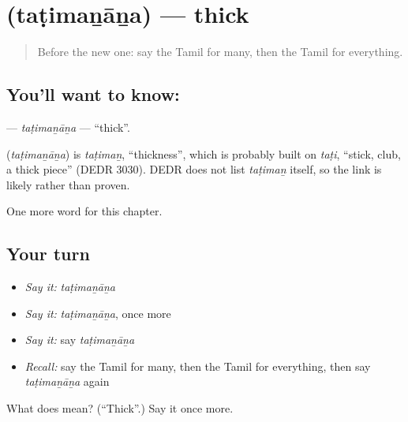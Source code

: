 \section[\texorpdfstring{\ta{தடிமனான} (taṭimaṉāṉa)}{தடிமனான (taṭimaṉāṉa)}]{ (taṭimaṉāṉa) — thick}

\label{lesson:TA-C181-tatimanana}



\begin{quote}
Before the new one: say the Tamil for many, then the Tamil for everything.
\end{quote}

\subsection*{You'll want to know: }
\textbf{} — \emph{taṭimaṉāṉa} — \textquotedblleft{}thick\textquotedblright{}.

\begin{cousinweb}
\textbf{} (\emph{taṭimaṉāṉa}) is \emph{taṭimaṉ}, \textquotedblleft{}thickness\textquotedblright{}, which is probably built on \emph{taṭi}, \textquotedblleft{}stick, club, a thick piece\textquotedblright{} (DEDR 3030). DEDR does not list \emph{taṭimaṉ} itself, so the link is likely rather than proven.
\end{cousinweb}

\begin{grammarlens}[title={What you've built}]
One more word for this chapter.
\end{grammarlens}

\subsection*{Your turn}
\begin{itemize}
\raggedright
  \item \emph{Say it:} \emph{taṭimaṉāṉa}
  \item \emph{Say it:} \emph{taṭimaṉāṉa}, once more
  \item \emph{Say it:} say \emph{taṭimaṉāṉa}
  \item \emph{Recall:} say the Tamil for many, then the Tamil for everything, then say \emph{taṭimaṉāṉa} again
\end{itemize}

\begin{tcolorbox}[breakable,colback=teal!4,colframe=teal!35!black,title={Before you move on}]
What does  mean? (\textquotedblleft{}Thick\textquotedblright{}.) Say it once more.
\end{tcolorbox}

